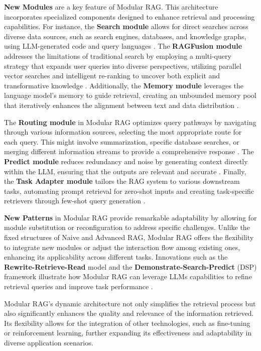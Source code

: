 \textbf{New Modules} are a key feature of Modular RAG. This architecture incorporates specialized components designed to enhance retrieval and processing capabilities. For instance, the \textbf{Search module} allows for direct searches across diverse data sources, such as search engines, databases, and knowledge graphs, using LLM-generated code and query languages \cite{wang2023knowledgpt}. The \textbf{RAGFusion module} addresses the limitations of traditional search by employing a multi-query strategy that expands user queries into diverse perspectives, utilizing parallel vector searches and intelligent re-ranking to uncover both explicit and transformative knowledge \cite{ragfusion2023}. Additionally, the \textbf{Memory module} leverages the language model’s memory to guide retrieval, creating an unbounded memory pool that iteratively enhances the alignment between text and data distribution \cite{cheng2024lift}.

The \textbf{Routing module} in Modular RAG optimizes query pathways by navigating through various information sources, selecting the most appropriate route for each query. This might involve summarization, specific database searches, or merging different information streams to provide a comprehensive response \cite{li2023classification}. The \textbf{Predict module} reduces redundancy and noise by generating context directly within the LLM, ensuring that the outputs are relevant and accurate \cite{yu2022generate}. Finally, the \textbf{Task Adapter module} tailors the RAG system to various downstream tasks, automating prompt retrieval for zero-shot inputs and creating task-specific retrievers through few-shot query generation \cite{cheng2023uprise}.

\textbf{New Patterns} in Modular RAG provide remarkable adaptability by allowing for module substitution or reconfiguration to address specific challenges. Unlike the fixed structures of Naive and Advanced RAG, Modular RAG offers the flexibility to integrate new modules or adjust the interaction flow among existing ones, enhancing its applicability across different tasks. Innovations such as the \textbf{Rewrite-Retrieve-Read} model and the \textbf{Demonstrate-Search-Predict} (DSP) framework illustrate how Modular RAG can leverage LLMs capabilities to refine retrieval queries and improve task performance \cite{khattab2022demonstrate}.

Modular RAG’s dynamic architecture not only simplifies the retrieval process but also significantly enhances the quality and relevance of the information retrieved. Its flexibility allows for the integration of other technologies, such as fine-tuning or reinforcement learning, further expanding its effectiveness and adaptability in diverse application scenarios.

